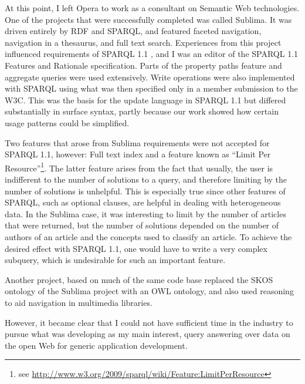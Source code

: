 At this point, I left Opera to work as a consultant on Semantic Web
technologies. One of the projects that were successfully completed was
called Sublima\cite{sublima}. It was driven entirely by RDF and SPARQL,
and featured faceted navigation, navigation in a thesaurus, and full
text search. Experiences from this project influenced requirements of
SPARQL 1.1 \cite{sparql11query}, and I was an editor of the SPARQL 1.1 Features and
Rationale specification\cite{sparql11new}. Parts of the property paths
feature and aggregate queries were used extensively. Write operations
were also implemented with SPARQL using what was then specified only
in a member submission to the W3C\cite{seaborne2008sparql}. This was the basis for
the update language in SPARQL 1.1 but differed substantially in
surface syntax, partly because our work showed how certain usage patterns
could be simplified. 

Two features that arose from Sublima requirements were not accepted
for SPARQL 1.1, however: Full text index and a feature known as
``Limit Per Resource''\footnote{see
  \url{http://www.w3.org/2009/sparql/wiki/Feature:LimitPerResource}}. The
latter feature arises from the fact that usually, the user is
indifferent to the number of solutions to a query, and therefore
limiting by the number of solutions is unhelpful. This is especially
true since other features of SPARQL, such as optional clauses, are
helpful in dealing with heterogeneous data. In the Sublima case, it
was interesting to limit by the number of articles that were returned,
but the number of solutions depended on the number of authors of an
article and the concepts used to classify an article. To achieve the
desired effect with SPARQL 1.1, one would have to write a very complex
subquery, which is undesirable for such an important feature.


Another project, based on much of the same code
base replaced the SKOS ontology of the Sublima project with an OWL
ontology, and also used reasoning to aid navigation in multimedia
libraries.



However, it became clear that I could not have sufficient time in the
industry to pursue what was developing as my main interest, query
answering over data on the open Web for generic application
development. 
